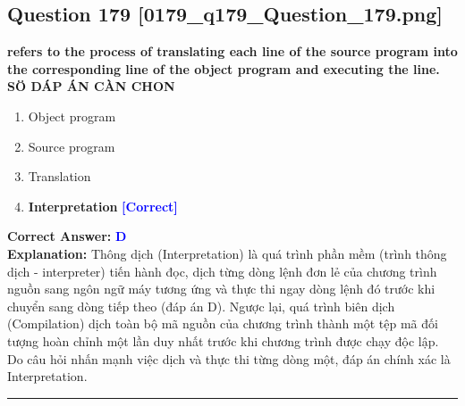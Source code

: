 \documentclass[11pt,a4paper]{article}
\begin{document}
\begin{minipage}{\textwidth}
\subsection*{Question 179 \quad \footnotesize{[0179\_q179\_Question\_179.png]}}
\noindent \textbf{refers to the process of translating each line of the source program into the corresponding line of the object program and executing the line. SÖ DÁP ÁN CÀN CHON}

\begin{enumerate}[label=\Alph*.]
    \item Object program
    \item Source program
    \item Translation
    \item \textbf{Interpretation} \hfill \textcolor{blue}{\textbf{[Correct]}}
\end{enumerate}

\noindent \textbf{Correct Answer:} \textcolor{blue}{\textbf{D}} \\[2pt]
\noindent \textbf{Explanation:} Thông dịch (Interpretation) là quá trình phần mềm (trình thông dịch - interpreter) tiến hành đọc, dịch từng dòng lệnh đơn lẻ của chương trình nguồn sang ngôn ngữ máy tương ứng và thực thi ngay dòng lệnh đó trước khi chuyển sang dòng tiếp theo (đáp án D). Ngược lại, quá trình biên dịch (Compilation) dịch toàn bộ mã nguồn của chương trình thành một tệp mã đối tượng hoàn chỉnh một lần duy nhất trước khi chương trình được chạy độc lập. Do câu hỏi nhấn mạnh việc dịch và thực thi từng dòng một, đáp án chính xác là Interpretation.

\par\vspace{0.3cm}
\hrule
\vspace{0.3cm}
\end{minipage}
\end{document}
